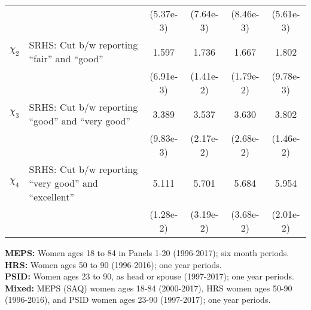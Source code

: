 \begin{table}[H]
\begin{center}
{\begin{tabular}{clcccc}
 & & (5.37e-3) & (7.64e-3) & (8.46e-3) & (5.61e-3) \\
$\chi_2$ & SRHS: Cut b/w reporting ``fair'' and ``good'' & 1.597 & 1.736 & 1.667 & 1.802 \\
 & & (6.91e-3) & (1.41e-2) & (1.79e-2) & (9.78e-3) \\
$\chi_3$ & SRHS: Cut b/w reporting ``good'' and ``very good'' & 3.389 & 3.537 & 3.630 & 3.802 \\
 & & (9.83e-3) & (2.17e-2) & (2.68e-2) & (1.46e-2) \\
$\chi_4$ & SRHS: Cut b/w reporting ``very good'' and ``excellent'' & 5.111 & 5.701 & 5.684 & 5.954 \\
 & & (1.28e-2) & (3.19e-2) & (3.68e-2) & (2.01e-2) \\
\hline\hline
\end{tabular}
 } 
 \usebox{\WomenParamsBox}  
\settowidth\TableWidth{\usebox{\WomenParamsBox}} %
\vspace{0.0cm} \parbox{\TableWidth}{
  \begin{flushleft}
\textbf{MEPS:} Women ages 18 to 84 in Panels 1-20 (1996-2017); six month periods.\\
\textbf{HRS:} Women ages 50 to 90 (1996-2016); one year periods.\\
\textbf{PSID:} Women ages 23 to 90, as head or spouse (1997-2017); one year periods.\\
\textbf{Mixed:} MEPS (SAQ) women ages 18-84 (2000-2017), HRS women ages 50-90 (1996-2016), and PSID women ages 23-90 (1997-2017); one year periods.\\
  \end{flushleft}
}
\end{center}
\end{table}
